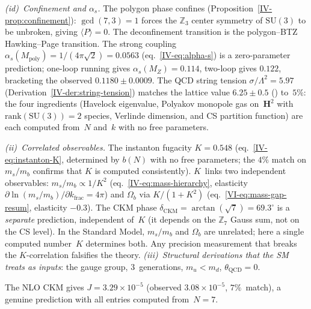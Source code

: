 \emph{(i\hspace{0.5pt}d)~Confinement and $\alpha_s$.}
The polygon phase confines
(Proposition~\ref{IV-prop:confinement}):
$\gcd(7,3) = 1$ forces the $\mathbb{Z}_3$ center symmetry
of $\mathrm{SU}(3)$ to be unbroken, giving
$\langle P\rangle = 0$.
The deconfinement transition is the polygon--BTZ
Hawking--Page transition.
The strong coupling $\alpha_s(M_{\mathrm{poly}})
= 1/(4\pi\sqrt{2}) = 0.0563$
(eq.~\eqref{IV-eq:alpha-s}) is a zero-parameter
prediction; one-loop running gives
$\alpha_s(M_Z) = 0.114$,
two-loop gives $0.122$, bracketing the
observed $0.1180 \pm 0.0009$.
The QCD string tension
$\sigma/\Lambda^2 = 5.97$
(Derivation~\ref{IV-der:string-tension})
matches the lattice value $6.25 \pm 0.5$
(\citealt{Bali2001}) to~$5\%$: the four ingredients
(Havelock eigenvalue, Polyakov monopole gas on~$\mathbf{H}^2$
with $\mathrm{rank}(\mathrm{SU}(3)) = 2$ species,
Verlinde dimension, and CS partition function) are each
computed from~$N$ and~$k$ with no free parameters.

\emph{(ii)~Correlated observables.}
The instanton fugacity $K = 0.548$
(eq.~\eqref{IV-eq:instanton-K},
determined by $b(N)$ with no free parameters;
the $4\%$ match on $m_s/m_b$
confirms that $K$ is computed consistently).
$K$~links two independent observables:
$m_s/m_b \propto 1/K^2$ (eq.~\eqref{IV-eq:mass-hierarchy},
elasticity $\partial\ln(m_s/m_b)/\partial k_{\mathrm{frac}} = 4\pi$)
and $\Omega_b$ via
$K/(1{+}K^2)$ (eq.~\eqref{VI-eq:mass-gap-resum},
elasticity $-0.3$).
The CKM phase $\delta_{\mathrm{CKM}} = \arctan(\sqrt{7}) = 69.3^\circ$
is a \emph{separate} prediction, independent of~$K$
(it depends on the $\mathbb{Z}_7$ Gauss sum,
not on the CS level).
In the Standard Model, $m_s/m_b$ and $\Omega_b$ are unrelated;
here a single computed number~$K$ determines both.
Any precision measurement that breaks the $K$-correlation
falsifies the theory.
\emph{(iii)~Structural derivations
that the SM treats as inputs}: the gauge group,
$3$~generations, $m_u < m_d$, $\theta_{\mathrm{QCD}} = 0$.

\noindent
The NLO CKM gives $J = 3.29 \times 10^{-5}$
(observed $3.08 \times 10^{-5}$, $7\%$~match), a genuine
prediction with all entries computed from~$N = 7$.

